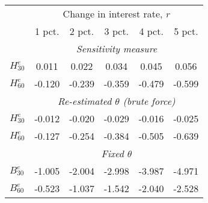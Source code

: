 \begin{tabular}{l*{5}{c}} \toprule 
& \multicolumn{5}{c}{ Change in interest rate, $r$ } \\ \cmidrule(lr){2-6}  
& 1 pct. & 2 pct. & 3 pct. & 4 pct. & 5 pct. \\ \midrule 
& \multicolumn{5}{c}{ \emph{Sensitivity measure} } \\ \cmidrule(lr){2-6}  
 $H^e_{30}$  & 0.011  & 0.022  & 0.034  & 0.045  & 0.056 
 \\ $H^e_{60}$  & -0.120  & -0.239  & -0.359  & -0.479  & -0.599 \\ \cmidrule(lr){2-6}  
& \multicolumn{5}{c}{ \emph{Re-estimated $\theta$ (brute force)} } \\ \cmidrule(lr){2-6}
 $H^e_{30}$  & -0.012  & -0.020  & -0.029  & -0.016  & -0.025 \\ 
 $H^e_{60}$  & -0.127  & -0.254  & -0.384  & -0.505  & -0.639 \\ \cmidrule(lr){2-6}  
& \multicolumn{5}{c}{ \emph{Fixed $\theta$ }} \\ \cmidrule(lr){2-6}
 $B^e_{30}$  & -1.005  & -2.004  & -2.998  & -3.987  & -4.971 \\ 
 $B^e_{60}$  & -0.523  & -1.037  & -1.542  & -2.040  & -2.528 \\ 
 \bottomrule  \end{tabular} 
